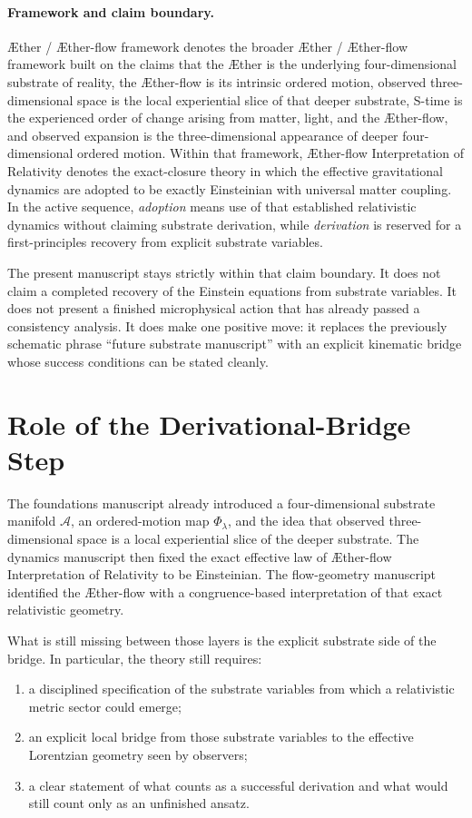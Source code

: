 \documentclass[11pt]{article}
\newcommand{\Aether}{\AE{}ther}
\newcommand{\Aflow}{\AE{}ther-flow}
\newcommand{\TheoryName}{\Aflow{} Interpretation of Relativity}
\newcommand{\TheoryProgram}{\Aether{} / \Aflow{} framework}
\newcommand{\Sub}{\mathcal{A}}
\begin{document}
\paragraph{Framework and claim boundary.}
\TheoryProgram{} denotes the broader \Aether{} / \Aflow{} framework built on the claims that the \Aether{} is the underlying four-dimensional substrate of reality, the \Aflow{} is its intrinsic ordered motion, observed three-dimensional space is the local experiential slice of that deeper substrate, S-time is the experienced order of change arising from matter, light, and the \Aflow{}, and observed expansion is the three-dimensional appearance of deeper four-dimensional ordered motion. Within that framework, \TheoryName{} denotes the exact-closure theory in which the effective gravitational dynamics are adopted to be exactly Einsteinian with universal matter coupling. In the active sequence, \emph{adoption} means use of that established relativistic dynamics without claiming substrate derivation, while \emph{derivation} is reserved for a first-principles recovery from explicit substrate variables.

The present manuscript stays strictly within that claim boundary. It does not claim a completed recovery of the Einstein equations from substrate variables. It does not present a finished microphysical action that has already passed a consistency analysis. It does make one positive move: it replaces the previously schematic phrase ``future substrate manuscript'' with an explicit kinematic bridge whose success conditions can be stated cleanly.

\section{Role of the Derivational-Bridge Step}

The foundations manuscript already introduced a four-dimensional substrate manifold \(\Sub\), an ordered-motion map \(\Phi_\lambda\), and the idea that observed three-dimensional space is a local experiential slice of the deeper substrate. The dynamics manuscript then fixed the exact effective law of \TheoryName{} to be Einsteinian. The flow-geometry manuscript identified the \Aflow{} with a congruence-based interpretation of that exact relativistic geometry.

What is still missing between those layers is the explicit substrate side of the bridge. In particular, the theory still requires:
\begin{enumerate}
    \item a disciplined specification of the substrate variables from which a relativistic metric sector could emerge;
    \item an explicit local bridge from those substrate variables to the effective Lorentzian geometry seen by observers;
    \item a clear statement of what counts as a successful derivation and what would still count only as an unfinished ansatz.
\end{enumerate}
\end{document}
